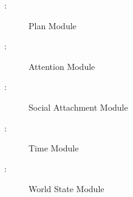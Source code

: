 \begin{description}
    \item [ \mthemnum \label{mPlan}:] Plan Module

    \item [ \mthemnum \label{mAttention}:] Attention Module

    \item [ \mthemnum \label{mSocial}:] Social Attachment
    Module

    \item [ \mthemnum \label{mTime}:] Time Module

    \item [ \mthemnum \label{mWorld}:] World State Module

\end{description}

